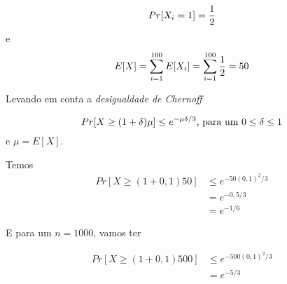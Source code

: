 \documentclass{article}
\begin{document}
\begin{equation}
	\notag
	Pr[X_i = 1] = \dfrac{1}{2}
\end{equation}
e
\begin{equation}
	\notag
	E[X] = \sum\limits_{i=1}^{100}E[X_i] = \sum\limits_{i=1}^{100}\dfrac{1}{2} = 50
\end{equation}

Levando em conta a \emph{desigualdade de Chernoff}

\begin{equation}
	\notag
	Pr[X\geq (1+\delta)\mu] \leq e^{-\mu \delta / 3}\text{, para um }0 \leq \delta \leq 1
\end{equation}
e $\mu = E[X]$.

Temos
\begin{equation}
	\begin{split}
		Pr[X \geq (1+0,1)50] &\leq e^{-50(0,1)^2/3}\\
		&= e^{-0,5/3}\\
		&= e^{-1/6}
	\end{split}
\end{equation}

E para um $n = 1000$, vamos ter

\begin{equation}
	\begin{split}
		Pr[X \geq (1+0,1)500] &\leq e^{-500(0,1)^2/3}\\
		&= e^{-5/3}
	\end{split}
\end{equation}
\end{document}
